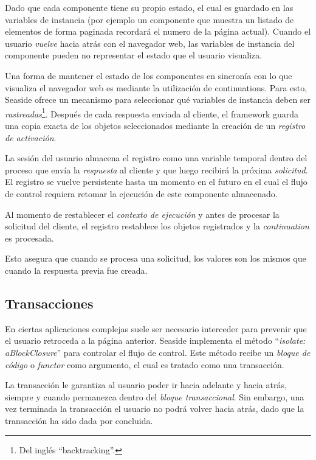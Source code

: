 Dado que cada componente tiene su propio estado, el cual es guardado en las variables de instancia (por ejemplo un componente que muestra un listado de elementos de forma paginada recordará el numero de la página actual). Cuando el usuario \emph{vuelve} hacia atrás con el navegador web, las variables de instancia del componente pueden no representar el estado que el usuario visualiza.

Una forma de mantener el estado de los componentes en sincronía con lo que visualiza el navegador web es mediante la utilización de continuations. Para esto, Seaside ofrece un mecanismo para seleccionar qué variables de instancia deben ser \emph{rastreadas}\footnote{Del inglés ``backtracking''.}. Después de cada respuesta enviada al cliente, el framework guarda una copia exacta de los objetos seleccionados mediante la creación de un \emph{registro de activación}.

La sesión del usuario almacena el registro como una variable temporal dentro del proceso que envía la \emph{respuesta} al cliente y que luego recibirá la próxima \emph{solicitud}. El registro se vuelve persistente hasta un momento en el futuro en el cual el flujo de control requiera retomar la ejecución de este componente almacenado.

Al momento de restablecer el \emph{contexto de ejecución} y antes de procesar la solicitud del cliente, el registro restablece los objetos registrados y la \emph{continuation} es procesada.

Esto asegura que cuando se procesa una solicitud, los valores son los mismos que cuando la respuesta previa fue creada.


\subsection{Transacciones}

En ciertas aplicaciones complejas suele ser necesario interceder para prevenir que el usuario retroceda a la página anterior. Seaside implementa el método ``\emph{isolate: aBlockClosure}'' para controlar el flujo de control. Este método recibe un \emph{bloque de código} o \emph{functor} como argumento, el cual es tratado como una transacción.

La transacción le garantiza al usuario poder ir hacia adelante y hacia atrás, siempre y cuando permanezca dentro del \emph{bloque transaccional}. Sin embargo, una vez terminada la transacción el usuario no podrá volver hacia atrás, dado que la transacción ha sido dada por concluida.


